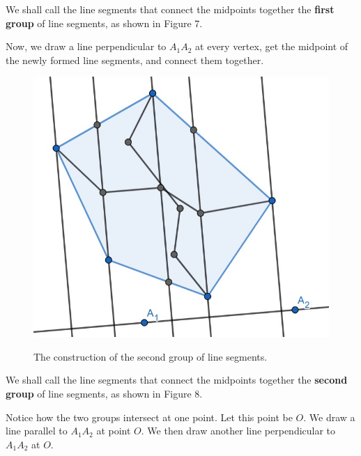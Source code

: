 \documentclass[12pt]{scrartcl}
\begin{document}
We shall call the line segments that connect the midpoints together the \textbf{first group} of line segments, as shown in Figure 7.

\pagebreak

Now, we draw a line perpendicular to $A_{1}A_{2}$ at every vertex, get the midpoint of the newly formed line segments, and connect them together. 

\begin{figure}[htpb]
	\centering
	\includegraphics[scale=.75]{images/rq3_1_3.jpg}
	\label{fig:rq3_1_3_img}
	\caption{The construction of the second group of line segments.}
\end{figure}

We shall call the line segments that connect the midpoints together the \textbf{second group} of line segments, as shown in Figure 8.

\pagebreak

Notice how the two groups intersect at one point. Let this point be $O$. We draw a line parallel to $A_{1}A_{2}$ at point $O$.
We then draw another line perpendicular to $A_{1}A_{2}$ at $O$. 
\end{document}
